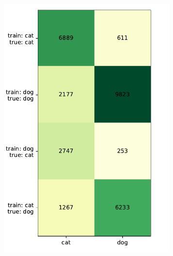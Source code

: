 \documentclass[a4paper,11pt]{scrartcl}
\theoremstyle{definition}
\begin{document}
\begin{figure}[H]
\begin{subfigure}[t]{0.32\textwidth}
\includegraphics[width=0.99\textwidth]{Plots_2/compound_3000_20_50_no_Title_same_scale.pdf}
\label{subfig:confusion_20_50}
\end{subfigure}
\begin{subfigure}[t]{0.32\textwidth}

\end{subfigure}
\end{figure}
\end{document}
